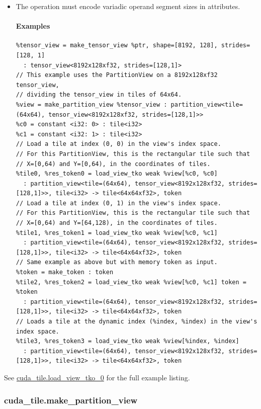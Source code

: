 \documentclass{article}
\begin{document}
\begin{itemize}
\item The operation must encode variadic operand segment sizes in attributes.


\paragraph{Examples}

\begin{lstlisting}
%tensor_view = make_tensor_view %ptr, shape=[8192, 128], strides=[128, 1]
  : tensor_view<8192x128xf32, strides=[128,1]>
// This example uses the PartitionView on a 8192x128xf32 tensor_view,
// dividing the tensor_view in tiles of 64x64.
%view = make_partition_view %tensor_view : partition_view<tile=(64x64), tensor_view<8192x128xf32, strides=[128,1]>>
%c0 = constant <i32: 0> : tile<i32>
%c1 = constant <i32: 1> : tile<i32>
// Load a tile at index (0, 0) in the view's index space.
// For this PartitionView, this is the rectangular tile such that
// X=[0,64) and Y=[0,64), in the coordinates of tiles.
%tile0, %res_token0 = load_view_tko weak %view[%c0, %c0]
  : partition_view<tile=(64x64), tensor_view<8192x128xf32, strides=[128,1]>>, tile<i32> -> tile<64x64xf32>, token
// Load a tile at index (0, 1) in the view's index space.
// For this PartitionView, this is the rectangular tile such that
// X=[0,64) and Y=[64,128), in the coordinates of tiles.
%tile1, %res_token1 = load_view_tko weak %view[%c0, %c1]
  : partition_view<tile=(64x64), tensor_view<8192x128xf32, strides=[128,1]>>, tile<i32> -> tile<64x64xf32>, token
// Same example as above but with memory token as input.
%token = make_token : token
%tile2, %res_token2 = load_view_tko weak %view[%c0, %c1] token = %token
  : partition_view<tile=(64x64), tensor_view<8192x128xf32, strides=[128,1]>>, tile<i32> -> tile<64x64xf32>, token
// Loads a tile at the dynamic index (%index, %index) in the view's index space.
%tile3, %res_token3 = load_view_tko weak %view[%index, %index]
  : partition_view<tile=(64x64), tensor_view<8192x128xf32, strides=[128,1]>>, tile<i32> -> tile<64x64xf32>, token
\end{lstlisting}

\end{itemize}
See \href{https://docs.nvidia.com/cuda/tile-ir/latest/sections/appendix.html#example-cuda-tile-load-view-tko-0}{cuda\_tile.load\_view\_tko\_0} for the full example listing.



\subsubsection{cuda\_tile.make\_partition\_view}
\end{document}
